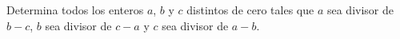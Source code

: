 Determina todos los enteros $a$, $b$ y $c$ distintos de cero tales que $a$ sea divisor de $b - c$, $b$ sea divisor de $c - a$ y $c$ sea divisor de $a - b$.